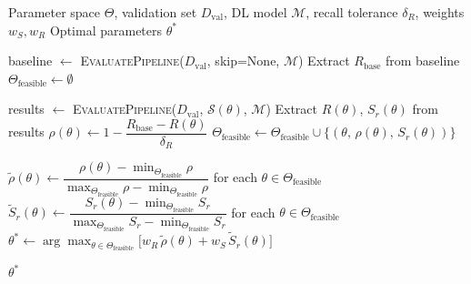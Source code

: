 \documentclass{article}
\begin{document}
\begin{preview}

    \setcounter{algorithm}{3} %

    \begin{algorithm}[H]
        \caption{Skip Module Hyperparameter Selection}
        \label{alg:hyperparam}
        \begin{algorithmic}[1]

            \Require Parameter space $\Theta$, validation set $D_{\text{val}}$,
            DL model $\mathcal{M}$, recall tolerance $\delta_R$,
            weights $w_S, w_R$
            \Ensure Optimal parameters $\theta^*$

            \State baseline $\gets$
            \textsc{EvaluatePipeline}($D_{\text{val}}$, skip=None,
            $\mathcal{M}$)
            \State Extract $R_{\text{base}}$ from baseline
            \State $\Theta_{\text{feasible}} \gets \emptyset$

            \State results $\gets$
            \textsc{EvaluatePipeline}($D_{\text{val}}$,
            $\mathcal{S}(\theta)$, $\mathcal{M}$)
            \State Extract $R(\theta)$, $S_r(\theta)$ from results
            \State $\rho(\theta) \gets 1 - \dfrac{R_{\text{base}} -
            R(\theta)}{\delta_R}$
            \State $\Theta_{\text{feasible}} \gets
            \Theta_{\text{feasible}} \cup \{(\theta,\,
            \rho(\theta),\, S_r(\theta))\}$
            \EndIf
            \EndFor

            \State $\tilde{\rho}(\theta) \gets \dfrac{\rho(\theta) -
            \min_{\Theta_{\text{feasible}}}\rho}{\max_{\Theta_{\text{feasible}}}\rho
            - \min_{\Theta_{\text{feasible}}}\rho}$ \quad for each
            $\theta \in \Theta_{\text{feasible}}$
            \State $\tilde{S}_r(\theta) \gets \dfrac{S_r(\theta) -
            \min_{\Theta_{\text{feasible}}}S_r}{\max_{\Theta_{\text{feasible}}}S_r
            - \min_{\Theta_{\text{feasible}}}S_r}$ \quad for each
            $\theta \in \Theta_{\text{feasible}}$
            \State $\theta^* \gets \arg\max_{\theta \in
            \Theta_{\text{feasible}}} \bigl[
            w_R\,\tilde{\rho}(\theta) + w_S\,\tilde{S}_r(\theta) \bigr]$

            \State \Return $\theta^*$

        \end{algorithmic}
    \end{algorithm}

\end{preview}
\end{document}
